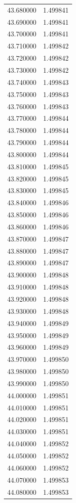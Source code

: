 \begin{tabular}{rr}
43.680000 & 1.499841 \\
43.690000 & 1.499841 \\
43.700000 & 1.499841 \\
43.710000 & 1.499842 \\
43.720000 & 1.499842 \\
43.730000 & 1.499842 \\
43.740000 & 1.499843 \\
43.750000 & 1.499843 \\
43.760000 & 1.499843 \\
43.770000 & 1.499844 \\
43.780000 & 1.499844 \\
43.790000 & 1.499844 \\
43.800000 & 1.499844 \\
43.810000 & 1.499845 \\
43.820000 & 1.499845 \\
43.830000 & 1.499845 \\
43.840000 & 1.499846 \\
43.850000 & 1.499846 \\
43.860000 & 1.499846 \\
43.870000 & 1.499847 \\
43.880000 & 1.499847 \\
43.890000 & 1.499847 \\
43.900000 & 1.499848 \\
43.910000 & 1.499848 \\
43.920000 & 1.499848 \\
43.930000 & 1.499848 \\
43.940000 & 1.499849 \\
43.950000 & 1.499849 \\
43.960000 & 1.499849 \\
43.970000 & 1.499850 \\
43.980000 & 1.499850 \\
43.990000 & 1.499850 \\
44.000000 & 1.499851 \\
44.010000 & 1.499851 \\
44.020000 & 1.499851 \\
44.030000 & 1.499851 \\
44.040000 & 1.499852 \\
44.050000 & 1.499852 \\
44.060000 & 1.499852 \\
44.070000 & 1.499853 \\
44.080000 & 1.499853 \\

\end{tabular}

